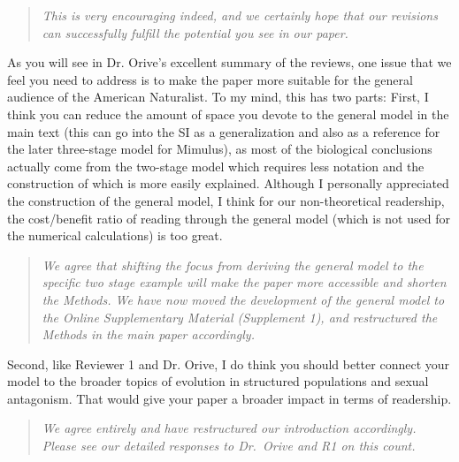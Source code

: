 \documentclass[11pt]{article}
\begin{document}
\begin{quote}
	{\itshape This is very encouraging indeed, and we certainly hope that our revisions can successfully fulfill the potential you see in our paper.}
\end{quote}

As you will see in Dr. Orive’s excellent summary of the reviews, one issue that we feel you need to address is to make the paper more suitable for the general audience of the American Naturalist. To my mind, this has two parts: First, I think you can reduce the amount of space you devote to the general model in the main text (this can go into the SI as a generalization and also as a reference for the later three-stage model for Mimulus), as most of the biological conclusions actually come from the two-stage model which requires less notation and the construction of which is more easily explained. Although I personally appreciated the construction of the general model, I think for our non-theoretical readership, the cost/benefit ratio of reading through the general model (which is not used for the numerical calculations) is too great. 

\begin{quote}
	{\itshape We agree that shifting the focus from deriving the general model to the specific two stage example will make the paper more accessible and shorten the Methods. We have now moved the development of the general model to the Online Supplementary Material (Supplement 1), and restructured the Methods in the main paper accordingly. }
\end{quote}

Second, like Reviewer 1 and Dr. Orive, I do think you should better connect your model to the broader topics of evolution in structured populations and sexual antagonism. That would give your paper a broader impact in terms of readership.

\begin{quote}
	{\itshape We agree entirely and have restructured our introduction accordingly. Please see our detailed responses to Dr.~Orive and R1 on this count.}
\end{quote}
\end{document}
